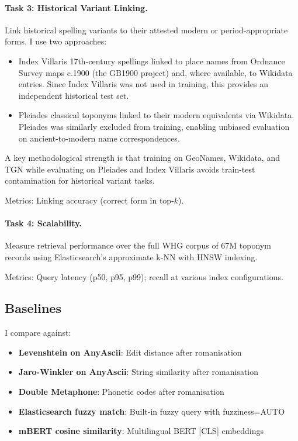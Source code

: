 \documentclass[11pt,a4paper]{article}
\begin{document}
\paragraph{Task 3: Historical Variant Linking.} Link historical spelling variants to their attested modern or period-appropriate forms. I use two approaches:
\begin{itemize}
    \item Index Villaris 17th-century spellings linked to place names from Ordnance Survey maps c.1900 (the GB1900 project) and, where available, to Wikidata entries. Since Index Villaris was not used in training, this provides an independent historical test set.
    \item Pleiades classical toponyms linked to their modern equivalents via Wikidata. Pleiades was similarly excluded from training, enabling unbiased evaluation on ancient-to-modern name correspondences.
\end{itemize}
A key methodological strength is that training on GeoNames, Wikidata, and TGN while evaluating on Pleiades and Index Villaris avoids train-test contamination for historical variant tasks.

Metrics: Linking accuracy (correct form in top-$k$).

\paragraph{Task 4: Scalability.} Measure retrieval performance over the full WHG corpus of 67M toponym records using Elasticsearch's approximate k-NN with HNSW indexing.

Metrics: Query latency (p50, p95, p99); recall at various index configurations.

\subsection{Baselines}

I compare against:

\begin{itemize}
    \item \textbf{Levenshtein on AnyAscii}: Edit distance after romanisation
    \item \textbf{Jaro-Winkler on AnyAscii}: String similarity after romanisation
    \item \textbf{Double Metaphone}: Phonetic codes after romanisation
    \item \textbf{Elasticsearch fuzzy match}: Built-in fuzzy query with fuzziness=AUTO
    \item \textbf{mBERT cosine similarity}: Multilingual BERT [CLS] embeddings
\end{itemize}
\end{document}
